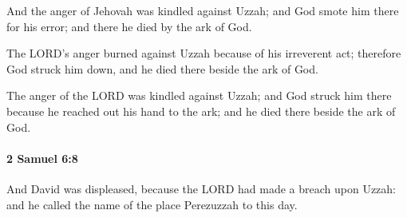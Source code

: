 			\begin{versebox}
					\item[BHS] 
					\item[ASV] And the anger of Jehovah was kindled against Uzzah; and God smote him there for his error; and there he died by the ark of God.
					\item[NIV] The LORD’s anger burned against Uzzah because of his irreverent act; therefore God struck him down, and he died there beside the ark of God.
					\item[NRSV] The anger of the LORD was kindled against Uzzah; and God struck him there because he reached out his hand to the ark; and he died there beside the ark of God.
			\end{versebox}

		\paragraph{2 Samuel 6:8} %
			\label{2SAMUEL-6-8}

			And David was displeased, because the LORD had made a breach upon Uzzah: and he called the name of the place Perezuzzah to this day.

